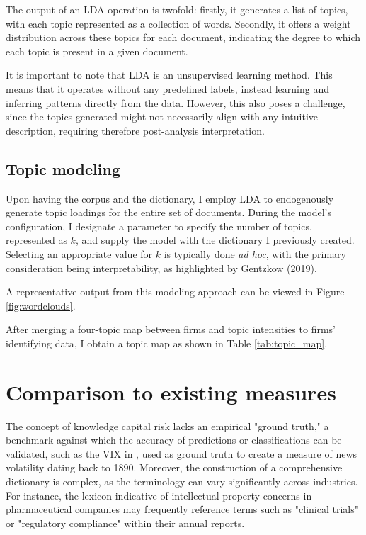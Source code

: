 \documentclass[12pt, letterpaper]{article}
\begin{document}
The output of an LDA operation is twofold: firstly, it generates a list of topics, with each topic represented as a collection of words. Secondly, it offers a weight distribution across these topics for each document, indicating the degree to which each topic is present in a given document.

It is important to note that LDA is an unsupervised learning method. This means that it operates without any predefined labels, instead learning and inferring patterns directly from the data. However, this also poses a challenge, since the topics generated might not necessarily align with any intuitive description, requiring therefore post-analysis interpretation. %

\subsection{Topic modeling}

Upon having the corpus and the dictionary, I employ LDA to endogenously generate topic loadings for the entire set of documents. During the model's configuration, I designate a parameter to specify the number of topics, represented as \(k\), and supply the model with the dictionary I previously created. Selecting an appropriate value for \(k\) is typically done \textit{ad hoc}, with the primary consideration being interpretability, as highlighted by Gentzkow (2019).

A representative output from this modeling approach can be viewed in Figure \ref{fig:wordclouds}.



After merging a four-topic map between firms and topic intensities to firms' identifying data, I obtain a topic map as shown in Table \ref{tab:topic_map}.

\tiny

\normalsize

\section{Comparison to existing measures}

The concept of knowledge capital risk lacks an empirical "ground truth," a benchmark against which the accuracy of predictions or classifications can be validated, such as the VIX in \cite{Manela2017-lj}, used as ground truth to create a measure of news volatility dating back to 1890. Moreover, the construction of a comprehensive dictionary is complex, as the terminology can vary significantly across industries. For instance, the lexicon indicative of intellectual property concerns in pharmaceutical companies may frequently reference terms such as "clinical trials" or "regulatory compliance" within their annual reports.
\end{document}
